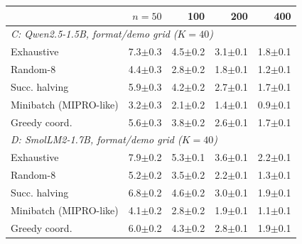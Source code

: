 \begin{tabular}{lrrrr}\toprule
 & $n{=}50$ & 100 & 200 & 400 \\\midrule
\multicolumn{5}{l}{\emph{C: Qwen2.5-1.5B, format/demo grid ($K{=}40$)}} \\
Exhaustive & 7.3$\pm$0.3 & 4.5$\pm$0.2 & 3.1$\pm$0.1 & 1.8$\pm$0.1 \\
Random-8 & 4.4$\pm$0.3 & 2.8$\pm$0.2 & 1.8$\pm$0.1 & 1.2$\pm$0.1 \\
Succ. halving & 5.9$\pm$0.3 & 4.2$\pm$0.2 & 2.7$\pm$0.1 & 1.7$\pm$0.1 \\
Minibatch (MIPRO-like) & 3.2$\pm$0.3 & 2.1$\pm$0.2 & 1.4$\pm$0.1 & 0.9$\pm$0.1 \\
Greedy coord. & 5.6$\pm$0.3 & 3.8$\pm$0.2 & 2.6$\pm$0.1 & 1.7$\pm$0.1 \\
\multicolumn{5}{l}{\emph{D: SmolLM2-1.7B, format/demo grid ($K{=}40$)}} \\
Exhaustive & 7.9$\pm$0.2 & 5.3$\pm$0.1 & 3.6$\pm$0.1 & 2.2$\pm$0.1 \\
Random-8 & 5.2$\pm$0.2 & 3.5$\pm$0.2 & 2.2$\pm$0.1 & 1.3$\pm$0.1 \\
Succ. halving & 6.8$\pm$0.2 & 4.6$\pm$0.2 & 3.0$\pm$0.1 & 1.9$\pm$0.1 \\
Minibatch (MIPRO-like) & 4.1$\pm$0.2 & 2.8$\pm$0.2 & 1.9$\pm$0.1 & 1.1$\pm$0.1 \\
Greedy coord. & 6.0$\pm$0.2 & 4.3$\pm$0.2 & 2.8$\pm$0.1 & 1.9$\pm$0.1 \\
\bottomrule
\end{tabular}
